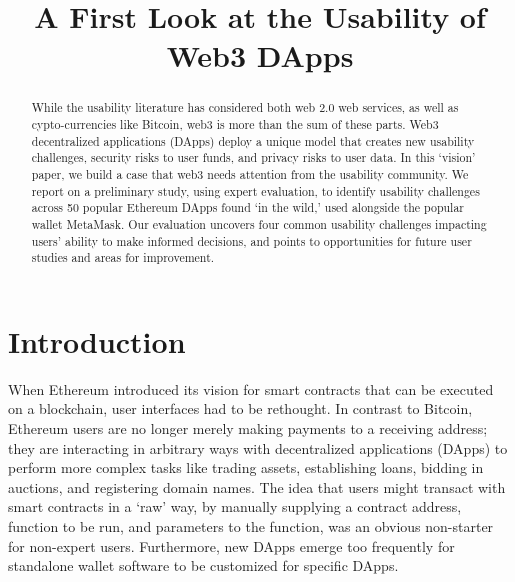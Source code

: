 \documentclass[conference]{IEEEtran}
\begin{document}
%
\title{A First Look at the Usability of Web3 DApps}
%
%
\author{}
%
%
\maketitle              %
%
\begin{abstract}
While the usability literature has considered both web 2.0 web services, as well as cypto-currencies like Bitcoin, web3 is more than the sum of these parts. Web3 decentralized applications (DApps) deploy a unique model that creates new usability challenges, security risks to user funds, and privacy risks to user data.
In this `vision' paper, we build a case that web3 needs attention from the usability community. 
We report on a preliminary study, using expert evaluation, to identify usability challenges across 50 popular Ethereum DApps found `in the wild,' used alongside the popular wallet MetaMask.
Our evaluation uncovers four common usability challenges impacting users' ability to make informed decisions, and points to opportunities for future user studies and areas for improvement.
\end{abstract}
%
%
%
\section{Introduction}

When Ethereum introduced its vision for smart contracts that can be executed on a blockchain, user interfaces had to be rethought. In contrast to Bitcoin, Ethereum users are no longer merely making payments to a receiving address; they are interacting in arbitrary ways with decentralized applications (DApps) to perform more complex tasks like trading assets, establishing loans, bidding in auctions, and registering domain names. The idea that users might transact with smart contracts in a `raw' way, by manually supplying a contract address, function to be run, and parameters to the function, was an obvious non-starter for non-expert users. Furthermore, new DApps emerge too frequently for standalone wallet software to be customized for specific DApps. 
\end{document}
